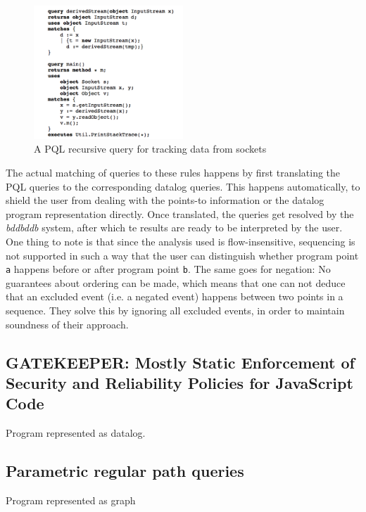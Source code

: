 \begin{figure}[!ht]
    \centering
      \includegraphics[width=0.5\textwidth]{images/derivedStream} 
      \caption{A PQL recursive query for tracking data from sockets}
    \label{fig:derivedStream}
\end{figure}

The actual matching of queries to these rules happens by first translating the PQL queries to the corresponding datalog queries. This happens automatically, to shield the user from dealing with the points-to information or the datalog program representation directly. Once translated, the queries get resolved by the \textit{bddbddb} system, after which te results are ready to be interpreted by the user. One thing to note is that since the analysis used is flow-insensitive, sequencing is not supported in such a way that the user can distinguish whether program point \texttt{a} happens before or after program point \texttt{b}. The same goes for negation: No guarantees about ordering can be made, which means that one can not deduce that an excluded event (i.e. a negated event) happens between two points in a sequence. They solve this by ignoring all excluded events, in order to maintain soundness of their approach.


\subsection{GATEKEEPER: Mostly Static Enforcement of Security and Reliability Policies for JavaScript Code}
Program represented as datalog.

\subsection{Parametric regular path queries}
Program represented as graph

